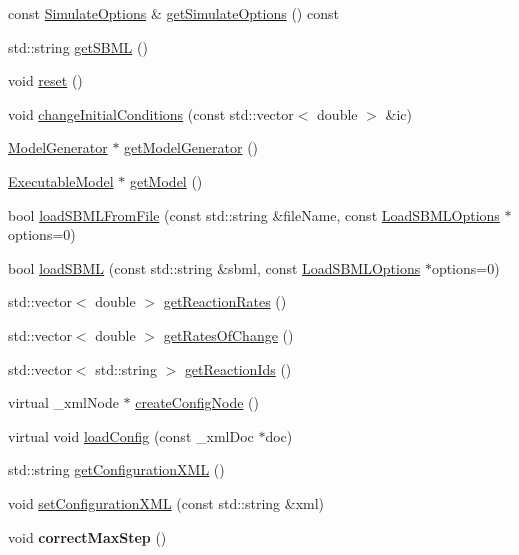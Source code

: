 \begin{DoxyCompactItemize}
\item 
const \hyperlink{structrr_1_1_simulate_options}{Simulate\-Options} \& \hyperlink{classrr_1_1_road_runner_ac5e47105d41a184299bbd4c9ec032257}{get\-Simulate\-Options} () const 
\item 
std\-::string \hyperlink{classrr_1_1_road_runner_ab46780863292ac487f9e32ebefd8e788}{get\-S\-B\-M\-L} ()
\item 
void \hyperlink{classrr_1_1_road_runner_ae4b0eaa39fd37737e5f5fd7f7741e06c}{reset} ()
\item 
void \hyperlink{classrr_1_1_road_runner_a57f1463dafcc61a90c3122a8fb37b08d}{change\-Initial\-Conditions} (const std\-::vector$<$ double $>$ \&ic)
\item 
\hyperlink{classrr_1_1_model_generator}{Model\-Generator} $\ast$ \hyperlink{classrr_1_1_road_runner_ada1e6bafd3e5dc03c5a04737f6922b0a}{get\-Model\-Generator} ()
\item 
\hyperlink{classrr_1_1_executable_model}{Executable\-Model} $\ast$ \hyperlink{classrr_1_1_road_runner_afa827d569de3c83dd286ac2aa25d1cf4}{get\-Model} ()
\item 
bool \hyperlink{classrr_1_1_road_runner_ae8b8feeff7bf6505b24410c67d3c50a3}{load\-S\-B\-M\-L\-From\-File} (const std\-::string \&file\-Name, const \hyperlink{structrr_1_1_load_s_b_m_l_options}{Load\-S\-B\-M\-L\-Options} $\ast$options=0)
\item 
bool \hyperlink{classrr_1_1_road_runner_a2ff55abccf558dee45752837ebddf2d5}{load\-S\-B\-M\-L} (const std\-::string \&sbml, const \hyperlink{structrr_1_1_load_s_b_m_l_options}{Load\-S\-B\-M\-L\-Options} $\ast$options=0)
\item 
std\-::vector$<$ double $>$ \hyperlink{classrr_1_1_road_runner_a7a0ea3394f25af5a84117c9ea8361dbd}{get\-Reaction\-Rates} ()
\item 
std\-::vector$<$ double $>$ \hyperlink{classrr_1_1_road_runner_a0bb915c515c4590da76e38a1346f0ed3}{get\-Rates\-Of\-Change} ()
\item 
std\-::vector$<$ std\-::string $>$ \hyperlink{classrr_1_1_road_runner_a3bcd761bfdad0571d290b6b23ea6f130}{get\-Reaction\-Ids} ()
\item 
virtual \-\_\-xml\-Node $\ast$ \hyperlink{classrr_1_1_road_runner_afd5401ecd63ac9dda2fe52f98066cb23}{create\-Config\-Node} ()
\item 
virtual void \hyperlink{classrr_1_1_road_runner_aac7ee8e64b2709d5d5a7e9b0cff8acc7}{load\-Config} (const \-\_\-xml\-Doc $\ast$doc)
\item 
std\-::string \hyperlink{classrr_1_1_road_runner_a1b92635414935e3d1d65fbac0d6871eb}{get\-Configuration\-X\-M\-L} ()
\item 
void \hyperlink{classrr_1_1_road_runner_a363c95863be438d85ac65b5db1b9bbe3}{set\-Configuration\-X\-M\-L} (const std\-::string \&xml)
\item 
\hypertarget{classrr_1_1_road_runner_a48965c4f1c455287f2e7ff1414da9d20}{void {\bfseries correct\-Max\-Step} ()}\label{classrr_1_1_road_runner_a48965c4f1c455287f2e7ff1414da9d20}


\end{DoxyCompactItemize}
